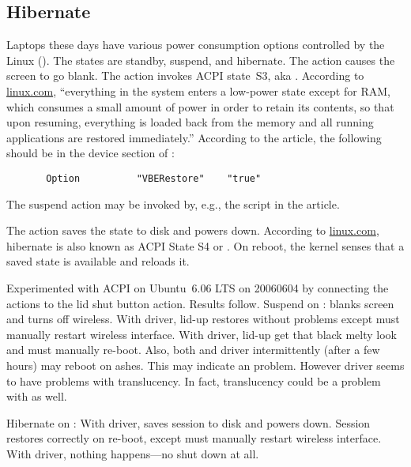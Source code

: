 \documentclass[12pt,twoside]{article}
\begin{document}
\subsection{Hibernate}\label{sxn:hibernate}
Laptops these days have various power consumption options controlled
by the Linux 
(). 
The states are standby, suspend, and hibernate.
The  action causes the screen to go blank.
The  action invokes ACPI state~S3, aka
.
According to
\href{http://www.linux.com/article.pl?sid=06/05/24/1716222}{linux.com},
``everything in the system enters a low-power state except for RAM,
which consumes a small amount of power in order to retain its
contents, so that upon resuming, everything is loaded back from the
memory and all running applications are restored immediately.''
According to the article, the following should be in the
device section of :
\begin{verbatim}
       Option          "VBERestore"    "true"
\end{verbatim}
The suspend action may be invoked by, e.g., the 
script in the article.

The  action saves the state to disk and powers down.
According to
\href{http://www.linux.com/article.pl?sid=06/05/24/1716222}{linux.com},
hibernate is also known as ACPI State S4 or .
On reboot, the kernel senses that a saved state is available and
reloads it. 

Experimented with ACPI on Ubuntu~6.06 LTS on 20060604 by connecting
the actions to the lid shut button action. Results follow.
Suspend on : blanks screen and turns off wireless.
With  driver, lid-up restores without problems except must
manually restart wireless interface. 
With  driver, lid-up get that black melty look and must
manually re-boot.
Also, both  and  driver intermittently
(after a few hours) may reboot on ashes.
This may indicate an  problem.
However  driver seems to have problems with translucency.
In fact, translucency could be a problem with  as well.

Hibernate on : With  driver, saves session to
disk and powers down. 
Session restores correctly on re-boot, except must manually restart
wireless interface. 
With  driver, nothing happens---no shut down at all.
\end{document}
